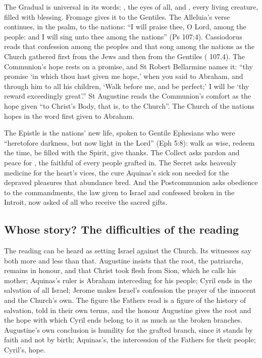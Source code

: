The Gradual is universal in its words: , the eyes of all,
and , every living creature, filled with blessing. Fromage
gives it to the Gentiles. The Alleluia's verse continues, in the psalm, to the
nations: ``I will praise thee, O Lord, among the people: and I will sing unto
thee among the nations'' (Ps 107:4). Cassiodorus reads that confession among the
peoples and that song among the nations as the Church gathered first from the
Jews and then from the Gentiles ( 107.4). The
Communion's hope rests on a promise, and St Robert Bellarmine names it: ``thy
promise `in which thou hast given me hope,' when you said to Abraham, and
through him to all his children, `Walk before me, and be perfect;' I will be
`thy reward exceedingly great'.'' St Augustine reads the Communion's comfort as
the hope given ``to Christ's Body, that is, to the Church''. The Church of the
nations hopes in the word first given to Abraham.

The Epistle is the nations' new life, spoken to Gentile Ephesians who were
``heretofore darkness, but now light in the Lord'' (Eph 5:8): walk as wise,
redeem the time, be filled with the Spirit, give thanks. The Collect asks pardon and peace for , the
faithful of every people grafted in. The Secret asks heavenly medicine for the
heart's vices, the cure Aquinas's sick son needed for the depraved pleasures that
abundance bred. And the Postcommunion asks obedience to the commandments, the
law given to Israel and confessed broken in the Introit, now asked of all who
receive the sacred gifts.

\subsection{Whose story? The difficulties of the reading}

The reading can be heard as setting Israel against the Church. Its witnesses
say both more and less than that. Augustine insists that the root, the
patriarchs, remains in honour, and that Christ took flesh from Sion, which he
calls his mother; Aquinas's ruler is Abraham interceding for his people; Cyril
ends in the salvation of all Israel; Jerome makes Israel's confession the
prayer of the innocent and the Church's own. The figure the Fathers read is a
figure of the history of salvation, told in their own terms, and the honour
Augustine gives the root and the hope with which Cyril ends belong to it as
much as the broken branches. Augustine's own conclusion is humility for
the grafted branch, since it stands by faith and not by birth; Aquinas's, the
intercession of the Fathers for their people; Cyril's, hope.

